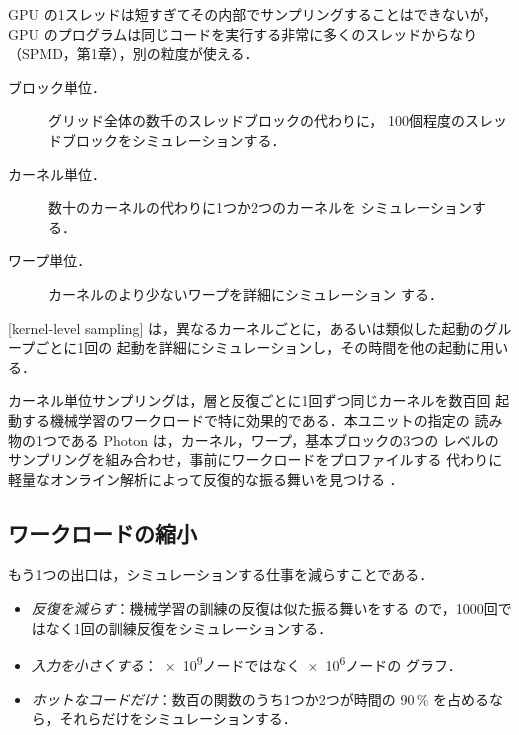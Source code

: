 \documentclass[../main.tex]{subfiles}
\begin{document}
GPU の1スレッドは短すぎてその内部でサンプリングすることはできないが，
GPU のプログラムは同じコードを実行する非常に多くのスレッドからなり
（SPMD，第1章），別の粒度が使える．
\begin{description}
  \item[ブロック単位．]  グリッド全体の数千のスレッドブロックの代わりに，
    100個程度のスレッドブロックをシミュレーションする．
  \item[カーネル単位．]  数十のカーネルの代わりに1つか2つのカーネルを
    シミュレーションする．
  \item[ワープ単位．]  カーネルのより少ないワープを詳細にシミュレーション
    する．
\end{description}

\begin{definition}[カーネル単位サンプリング]
  \label{def:l08-kernel-sampling}
  [kernel-level sampling]
  は，異なるカーネルごとに，あるいは類似した起動のグループごとに1回の
  起動を詳細にシミュレーションし，その時間を他の起動に用いる．
\end{definition}

カーネル単位サンプリングは，層と反復ごとに1回ずつ同じカーネルを数百回
起動する機械学習のワークロードで特に効果的である．本ユニットの指定の
読み物の1つである Photon は，カーネル，ワープ，基本ブロックの3つの
レベルのサンプリングを組み合わせ，事前にワークロードをプロファイルする
代わりに軽量なオンライン解析によって反復的な振る舞いを見つける
\cite{liu2023photon}．

\subsection{ワークロードの縮小}

もう1つの出口は，シミュレーションする仕事を減らすことである．
\begin{itemize}
  \item \emph{反復を減らす}：機械学習の訓練の反復は似た振る舞いをする
    ので，1000回ではなく1回の訓練反復をシミュレーションする．
  \item \emph{入力を小さくする}：\num{e9}ノードではなく\num{e6}ノードの
    グラフ．
  \item \emph{ホットなコードだけ}：数百の関数のうち1つか2つが時間の
    90\,\% を占めるなら，それらだけをシミュレーションする．
\end{itemize}
\end{document}

